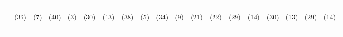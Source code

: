 \begin{tabular}{lcccccccccccccccccc}
 & \begin{footnotesize}(36)\end{footnotesize} & \begin{footnotesize}(7)\end{footnotesize} & \begin{footnotesize}(40)\end{footnotesize} & \begin{footnotesize}(3)\end{footnotesize} & \begin{footnotesize}(30)\end{footnotesize} & \begin{footnotesize}(13)\end{footnotesize} & \begin{footnotesize}(38)\end{footnotesize} & \begin{footnotesize}(5)\end{footnotesize} & \begin{footnotesize}(34)\end{footnotesize} & \begin{footnotesize}(9)\end{footnotesize} & \begin{footnotesize}(21)\end{footnotesize} & \begin{footnotesize}(22)\end{footnotesize} & \begin{footnotesize}(29)\end{footnotesize} & \begin{footnotesize}(14)\end{footnotesize} & \begin{footnotesize}(30)\end{footnotesize} & \begin{footnotesize}(13)\end{footnotesize} & \begin{footnotesize}(29)\end{footnotesize} & \begin{footnotesize}(14)\end{footnotesize}\\
\noalign{\smallskip}\hline\end{tabular}\\
